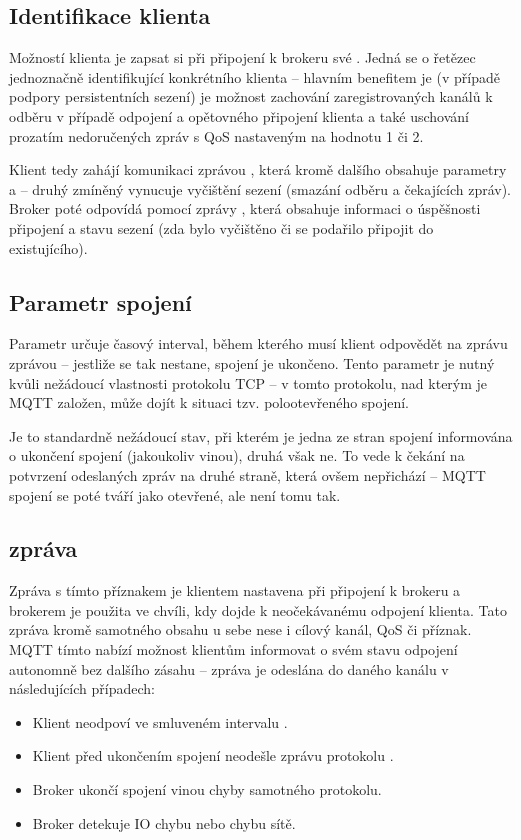 \subsection{Identifikace klienta }\label{subsec:identifikace-klienta-client-id}
Možností klienta je zapsat si při připojení k brokeru své .
Jedná se o řetězec jednoznačně identifikující konkrétního klienta -- hlavním benefitem je (v případě podpory
persistentních sezení) je možnost zachování zaregistrovaných kanálů k odběru v případě odpojení a
opětovného připojení klienta a také uschování prozatím nedoručených zpráv s QoS nastaveným na hodnotu 1 či 2.

Klient tedy zahájí komunikaci zprávou , která kromě dalšího obsahuje parametry  a  -- druhý zmíněný vynucuje vyčištění sezení (smazání odběru a čekajících zpráv).
Broker poté odpovídá pomocí zprávy , která obsahuje informaci o úspěšnosti připojení a stavu sezení (zda
bylo vyčištěno či se podařilo připojit do existujícího).

\subsection{Parametr spojení }\label{subsec:parametr-spojeni-keep-alive}
Parametr  určuje časový interval, během kterého musí klient odpovědět na zprávu  zprávou
 -- jestliže se tak nestane, spojení je ukončeno.
Tento parametr je nutný kvůli nežádoucí vlastnosti protokolu TCP --
v tomto protokolu, nad kterým je MQTT založen, může dojít k situaci tzv. polootevřeného spojení.

Je to standardně nežádoucí stav, při kterém je jedna ze stran spojení informována o ukončení spojení (jakoukoliv
vinou), druhá však ne.
To vede k čekání na potvrzení odeslaných zpráv na druhé straně, která ovšem nepřichází -- MQTT spojení se poté
tváří jako otevřené, ale není tomu tak.

\subsection{ zpráva}\label{subsec:last-will-zprava}
Zpráva s tímto příznakem je klientem nastavena při připojení k brokeru a brokerem je použita ve chvíli, kdy dojde
k neočekávanému odpojení klienta.
Tato zpráva  kromě samotného obsahu u sebe nese i cílový kanál, QoS či 
příznak.
MQTT tímto nabízí možnost klientům informovat o svém stavu odpojení autonomně bez dalšího zásahu --
 zpráva je odeslána do daného kanálu v následujících případech:
\begin{itemize}
    \item Klient neodpoví ve smluveném intervalu .
    \item Klient před ukončením spojení neodešle zprávu protokolu .
    \item Broker ukončí spojení vinou chyby samotného protokolu.
    \item Broker detekuje IO chybu nebo chybu sítě.
\end{itemize}


